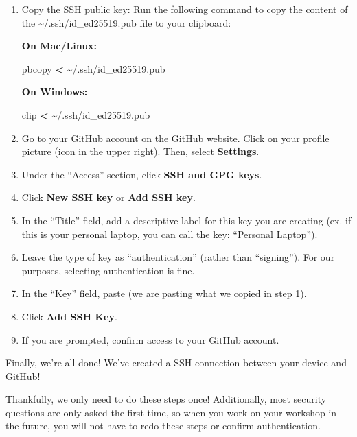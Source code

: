 \documentclass[
]{book}
\newenvironment{Shaded}{\begin{snugshade}}{\end{snugshade}}
\newcommand{\ExtensionTok}[1]{#1}
\newcommand{\NormalTok}[1]{#1}
\newcommand{\OperatorTok}[1]{\textcolor[rgb]{0.81,0.36,0.00}{\textbf{#1}}}
\theoremstyle{definition}
\theoremstyle{definition}
\theoremstyle{definition}
\theoremstyle{definition}
\theoremstyle{remark}
\begin{document}
\begin{enumerate}
\def\labelenumi{\arabic{enumi}.}
\item
  Copy the SSH public key: Run the following command to copy the content of the \textasciitilde/.ssh/id\_ed25519.pub file to your clipboard:

  \textbf{On Mac/Linux:}

\begin{Shaded}
\begin{Highlighting}[]
\ExtensionTok{pbcopy} \OperatorTok{\textless{}}\NormalTok{ \textasciitilde{}/.ssh/id\_ed25519.pub}
\end{Highlighting}
\end{Shaded}

  \textbf{On Windows:}

\begin{Shaded}
\begin{Highlighting}[]
\ExtensionTok{clip} \OperatorTok{\textless{}}\NormalTok{ \textasciitilde{}/.ssh/id\_ed25519.pub}
\end{Highlighting}
\end{Shaded}
\item
  Go to your GitHub account on the GitHub website. Click on your profile picture (icon in the upper right). Then, select \textbf{Settings}.
\item
  Under the ``Access'' section, click \textbf{SSH and GPG keys}.
\item
  Click \textbf{New SSH key} or \textbf{Add SSH key}.
\item
  In the ``Title'' field, add a descriptive label for this key you are creating (ex. if this is your personal laptop, you can call the key: ``Personal Laptop'').
\item
  Leave the type of key as ``authentication'' (rather than ``signing''). For our purposes, selecting authentication is fine.
\item
  In the ``Key'' field, paste (we are pasting what we copied in step 1).
\item
  Click \textbf{Add SSH Key}.
\item
  If you are prompted, confirm access to your GitHub account.
\end{enumerate}

Finally, we're all done! We've created a SSH connection between your device and GitHub!

Thankfully, we only need to do these steps once! Additionally, most security questions are only asked the first time, so when you work on your workshop in the future, you will not have to redo these steps or confirm authentication.
\end{document}
